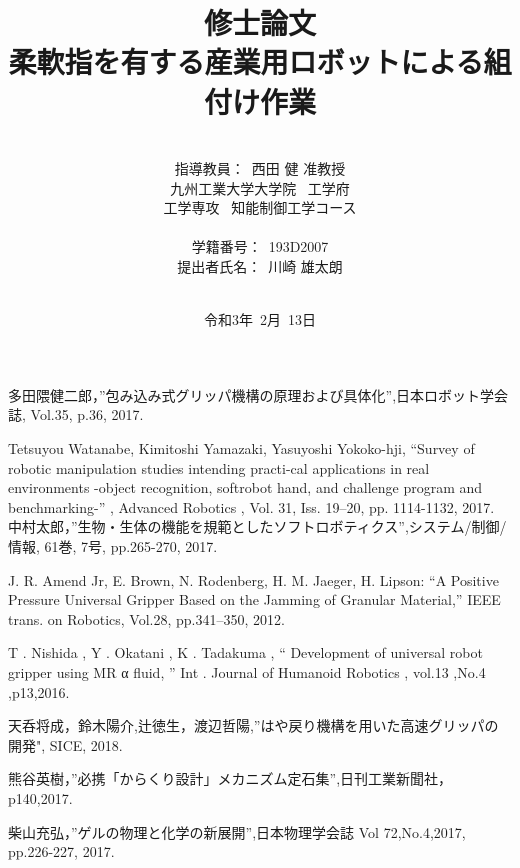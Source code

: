 \documentclass[a4paper,12pt]{jarticle}
\title{修士論文\\
柔軟指を有する産業用ロボットによる組付け作業\\
}
\author{\vspace{90mm}\\
指導教員：\ 西田 \hspace{0mm} 健 准教授\\
九州工業大学大学院\ \hspace{0mm} 工学府\\
工学専攻\ \hspace{0mm} 知能制御工学コース \\
\vspace{0mm}\\
学籍番号：\ 193D2007\\
提出者氏名：\ 川崎 \hspace{0mm} 雄太朗\\\vspace{5mm}\\ }
\date{令和3年\ 2月\ 13日}
\begin{document}
\titlepage
\maketitle
\thispagestyle{empty}
\newpage

\thispagestyle{empty}

\newpage
\tableofcontents


\newpage

\newpage
%
\newpage

\newpage
%
\newpage
%
\newpage
%
%



\begin{thebibliography}{99}

 多田隈健二郎，”包み込み式グリッパ機構の原理および具体化”,日本ロボット学会誌, Vol.35, p.36, 2017.

 Tetsuyou Watanabe, Kimitoshi Yamazaki, Yasuyoshi Yokoko-hji, “Survey of robotic manipulation studies intending practi-cal applications in real environments -object recognition, softrobot hand, and challenge program and benchmarking-” , Advanced Robotics , Vol. 31, Iss. 19–20, pp. 1114-1132, 2017.
 中村太郎，”生物・生体の機能を規範としたソフトロボティクス”,システム/制御/情報, 61巻, 7号, pp.265-270, 2017.

J. R. Amend Jr, E. Brown, N. Rodenberg, H. M. Jaeger, H. Lipson: “A Positive Pressure
Universal Gripper Based on the Jamming of Granular Material,” IEEE trans. on Robotics,
Vol.28, pp.341–350, 2012.

T . Nishida , Y . Okatani , K . Tadakuma ,
“ Development of universal robot gripper using
MR α fluid, ” Int . Journal of Humanoid Robotics , vol.13 ,No.4 ,p13,2016.

 天呑将成，鈴木陽介,辻徳生，渡辺哲陽,”はや戻り機構を用いた高速グリッパの開発", SICE, 2018.

 熊谷英樹，”必携「からくり設計」メカニズム定石集”,日刊工業新聞社，p140,2017.

 柴山充弘，”ゲルの物理と化学の新展開”,日本物理学会誌 Vol 72,No.4,2017, pp.226-227, 2017.  


\end{thebibliography}
\end{document}

